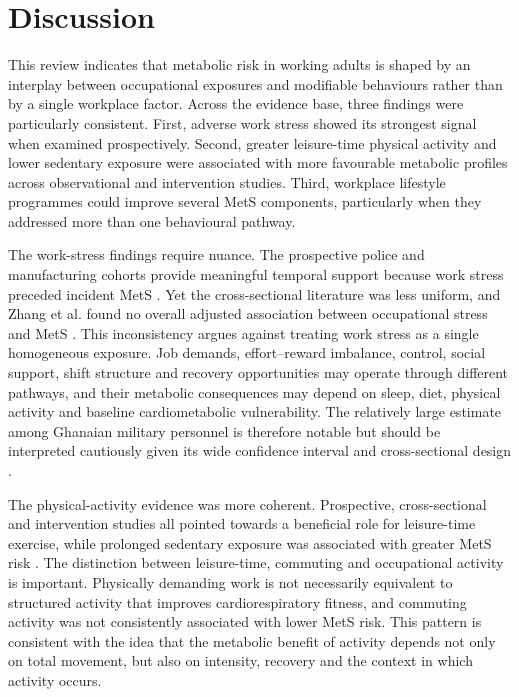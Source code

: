 \documentclass[11pt]{article}
\begin{document}
\section{Discussion}

This review indicates that metabolic risk in working adults is shaped by an interplay between occupational exposures and modifiable behaviours rather than by a single workplace factor. Across the evidence base, three findings were particularly consistent. First, adverse work stress showed its strongest signal when examined prospectively. Second, greater leisure-time physical activity and lower sedentary exposure were associated with more favourable metabolic profiles across observational and intervention studies. Third, workplace lifestyle programmes could improve several MetS components, particularly when they addressed more than one behavioural pathway.

The work-stress findings require nuance. The prospective police and manufacturing cohorts provide meaningful temporal support because work stress preceded incident MetS \citep{Garbarino2015,Yamaguchi2018}. Yet the cross-sectional literature was less uniform, and Zhang et al. found no overall adjusted association between occupational stress and MetS \citep{Zhang2024}. This inconsistency argues against treating work stress as a single homogeneous exposure. Job demands, effort--reward imbalance, control, social support, shift structure and recovery opportunities may operate through different pathways, and their metabolic consequences may depend on sleep, diet, physical activity and baseline cardiometabolic vulnerability. The relatively large estimate among Ghanaian military personnel is therefore notable but should be interpreted cautiously given its wide confidence interval and cross-sectional design \citep{Ayeltigah2026Military}.

The physical-activity evidence was more coherent. Prospective, cross-sectional and intervention studies all pointed towards a beneficial role for leisure-time exercise, while prolonged sedentary exposure was associated with greater MetS risk \citep{Kuwahara2016,Browne2017,Huang2017Taiwan,Motuma2020}. The distinction between leisure-time, commuting and occupational activity is important. Physically demanding work is not necessarily equivalent to structured activity that improves cardiorespiratory fitness, and commuting activity was not consistently associated with lower MetS risk. This pattern is consistent with the idea that the metabolic benefit of activity depends not only on total movement, but also on intensity, recovery and the context in which activity occurs.
\end{document}
